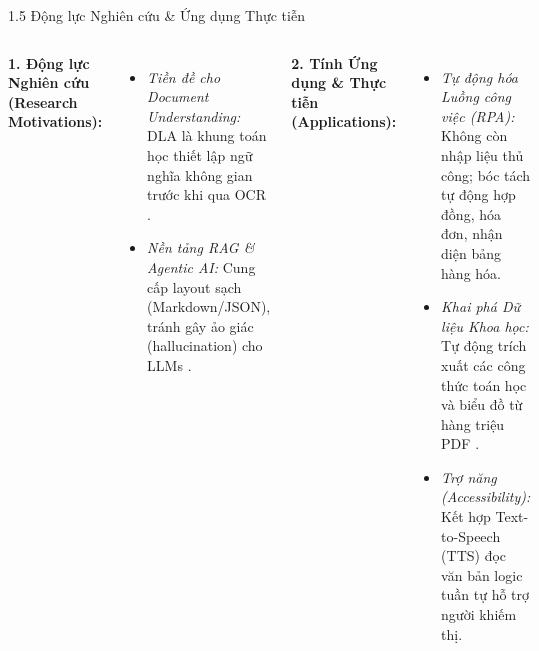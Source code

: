 \documentclass[aspectratio=1610,8pt]{beamer}
\begin{document}
\begin{frame}{1.5 \; Động lực Nghiên cứu \& Ứng dụng Thực tiễn}
    \begin{columns}[T]
        \textbf{1. Động lực Nghiên cứu (Research Motivations):}
        \begin{itemize}
            \item \textit{Tiền đề cho Document Understanding:} DLA là khung toán học thiết lập ngữ nghĩa không gian trước khi qua OCR \cite{vsr2021}.
            \item \textit{Nền tảng RAG \& Agentic AI:} Cung cấp layout sạch (Markdown/JSON), tránh gây ảo giác (hallucination) cho LLMs \cite{dla_2025_arxiv_scan_semantic_document_layout_analysis_for_textual_and_visual_retriev}.
        \end{itemize}

        \textbf{2. Tính Ứng dụng \& Thực tiễn (Applications):}
        \begin{itemize}
            \item \textit{Tự động hóa Luồng công việc (RPA):} Không còn nhập liệu thủ công; bóc tách tự động hợp đồng, hóa đơn, nhận diện bảng hàng hóa.
            \item \textit{Khai phá Dữ liệu Khoa học:} Tự động trích xuất các công thức toán học và biểu đồ từ hàng triệu PDF \cite{dla_2024_arxiv_doclayout_yolo_enhancing_document_layout_analysis_through_diverse_syn}.
            \item \textit{Trợ năng (Accessibility):} Kết hợp Text-to-Speech (TTS) đọc văn bản logic tuần tự hỗ trợ người khiếm thị.
        \end{itemize}
    \end{columns}
\end{frame}

\end{document}
